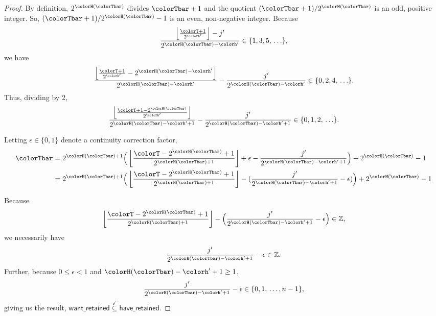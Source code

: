\begin{proof}
By definition, $2^{\colorH(\colorTbar)}$ divides $\colorTbar + 1$ and the quotient $(\colorTbar + 1) / 2^{\colorH(\colorTbar)}$ is an odd, positive integer.
So, $(\colorTbar + 1) / 2^{\colorH(\colorTbar)} - 1$ is an even, non-negative integer.
Because
\begin{align*}
\frac{\left\lfloor \frac{\colorT + 1}{2^{\colorh'}} \right\rfloor - j'}{2^{\colorH(\colorTbar) - \colorh'}} \in \{1, 3, 5, \, \ldots\},
\end{align*}
we have
\begin{align*}
\frac{\left\lfloor \frac{\colorT + 1}{2^{\colorh'}} - 2^{\colorH(\colorTbar) - \colorh'} \right\rfloor}{2^{\colorH(\colorTbar) - \colorh'}}
- \frac{j'}{2^{\colorH(\colorTbar) - \colorh'}} \in \{0, 2, 4, \, \ldots\}.
\end{align*}
Thus, dividing by 2,
\begin{align*}
\frac{
  \left\lfloor
  \frac{\colorT + 1 - 2^{\colorH(\colorTbar)}}{2^{\colorh'}}
  \right\rfloor
}{
  2^{\colorH(\colorTbar) - \colorh' + 1}
}
- \frac{j'}{
  2^{\colorH(\colorTbar) - \colorh' + 1}
}
\in \{0,1,2,\,\ldots\}.
\end{align*}

Letting $\epsilon \in \{0, 1\}$ denote a continuity correction factor,
\begin{align*}
\colorTbar
&= 2^{\colorH(\colorTbar) + 1}
\Big(
\left\lfloor
\frac{
  \colorT - 2^{\colorH(\colorTbar)} + 1
}{
  2^{\colorH(\colorTbar) + 1}
}
\right\rfloor
+ \epsilon
- \frac{j'}{2^{\colorH(\colorTbar) - \colorh' + 1}}
\Big)
+ 2^{\colorH(\colorTbar)}
- 1\\
&= 2^{\colorH(\colorTbar) + 1}
\Big(
\left\lfloor
\frac{
  \colorT - 2^{\colorH(\colorTbar)} + 1
}{
  2^{\colorH(\colorTbar) + 1}
}
\right\rfloor
- (
  \frac{j'}{2^{\colorH(\colorTbar) - \colorh' + 1}}
  - \epsilon
)
\Big)
+ 2^{\colorH(\colorTbar)}
- 1\\
\end{align*}

Because
\begin{align*}
\left\lfloor
\frac{
  \colorT - 2^{\colorH(\colorTbar)} + 1
}{
  2^{\colorH(\colorTbar) + 1}
}
\right\rfloor
- \Big(
\frac{j'}{2^{\colorH(\colorTbar) - \colorh' + 1}}
- \epsilon
\Big)
\in \mathbb{Z},
\end{align*}
we necessarily have
\begin{align*}
\frac{j'}{2^{\colorH(\colorTbar) - \colorh' + 1}}
- \epsilon
\in \mathbb{Z}.
\end{align*}
Further, because $0 \leq \epsilon < 1$ and $\colorH(\colorTbar) - \colorh'  + 1 \geq 1$,
\begin{align*}
\frac{j'}{2^{\colorH(\colorTbar) - \colorh' + 1}}
- \epsilon
\in
\{0, 1, \,\ldots, n - 1\},
\end{align*}
giving us the result, $\mathsf{want\_retained} \stackrel{\checkmark}{\subseteq} \mathsf{have\_retained}$.
\end{proof}
